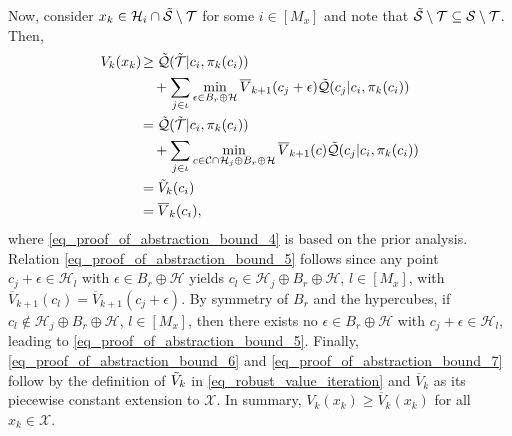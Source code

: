 \documentclass{IEEEtran}
\begin{document}
\begin{appendices}
Now, consider $x_k\in
\mathcal{H}_i\cap\Tilde{\mathcal{S}}\setminus{\mathcal{T}}$ for some $i\in[M_x]$ and note that $\Tilde{\mathcal{S}}\setminus{\mathcal{T}}\subseteq \mathcal{S}\setminus\mathcal{T}$. Then,
\begin{subequations}
    \begin{align}
        V_k({x}_k)\!
        &\geq \Tilde{\mathcal{Q}}(\Tilde{\mathcal{T}}| c_i,\pi_k(c_i))
         \label{eq_proof_of_abstraction_bound_4}\\& \quad +\sum_{j\in\iota}\min_{\epsilon\in B_r\oplus\mathcal{H}}\overline{V}_{k+1}(c_j+\epsilon)\Tilde{\mathcal{Q}}(c_j| c_i,\pi_k(c_i)) \nonumber
        \\
        & = \Tilde{\mathcal{Q}}(\Tilde{\mathcal{T}}| c_i,\pi_k(c_i))
         \label{eq_proof_of_abstraction_bound_5} \\& \quad +\sum_{j\in\iota}\min_{c\in\mathcal{C}\cap \mathcal{H}_j\oplus B_r\oplus \mathcal{H}}\overline{V}_{k+1}({c})\Tilde{\mathcal{Q}}(c_j| c_i,\pi_k(c_i))\nonumber
         \\
         &=\Tilde{V}_k(c_i)\label{eq_proof_of_abstraction_bound_6}
         \\
         &=\overline{V}_k(c_i),\label{eq_proof_of_abstraction_bound_7}
    \end{align}%
    \label{eq_proof_of_abstraction_bound}%
\end{subequations}%
where \eqref{eq_proof_of_abstraction_bound_4} is based on the prior analysis. Relation \eqref{eq_proof_of_abstraction_bound_5} follows since any point $c_j+\epsilon\in\mathcal{H}_l$ with $\epsilon\in B_r\oplus\mathcal{H}$ yields $c_l\in \mathcal{H}_j\oplus B_r\oplus\mathcal{H}$, $l\in[M_x]$, with $\overline{V}_{k+1}(c_l)=\overline{V}_{k+1}(c_j+\epsilon)$. By symmetry of $B_r$ and the hypercubes, if $c_l\notin \mathcal{H}_j\oplus B_r\oplus\mathcal{H}$, $l\in[M_x]$, then there exists no $\epsilon\in B_r\oplus\mathcal{H}$ with $c_j+\epsilon\in\mathcal{H}_l$, leading to \eqref{eq_proof_of_abstraction_bound_5}. Finally, \eqref{eq_proof_of_abstraction_bound_6} and \eqref{eq_proof_of_abstraction_bound_7} follow by the definition of $\Tilde{V}_k$ in \eqref{eq_robust_value_iteration} and $\overline{V}_k$ as its piecewise constant extension to $\mathcal{X}$. In summary, $V_k({x}_k)\geq \overline{V}_k(x_k)$ for all $x_k\in\mathcal{X}$.


\end{appendices}
\end{document}
